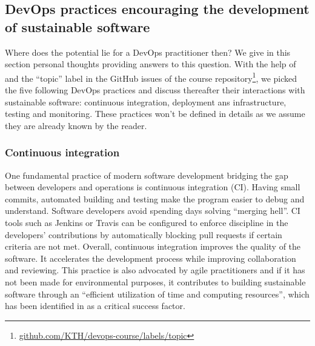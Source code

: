 \documentclass[11pt,twocolumn]{article}
\begin{document}
\subsection{DevOps practices encouraging the development of sustainable software}
\label{devops_practices}
Where does the potential lie for a DevOps practitioner then? We give in this section personal thoughts providing answers to this question. With the help of \cite{jabbariWhatDevOpsSystematic2016} and the ``topic'' label in the GitHub issues of the course repository\footnote{\url{github.com/KTH/devops-course/labels/topic}}, we picked the five following DevOps practices and discuss thereafter their interactions with sustainable software: continuous integration, deployment ans infrastructure, testing and monitoring. These practices won't be defined in details as we assume they are already known by the reader.

\subsubsection{Continuous integration}
One fundamental practice of modern software development bridging the gap between developers and operations is continuous integration (CI). Having small commits, automated building and testing make the program easier to debug and understand. Software developers avoid spending days solving ``merging hell''. CI tools such as Jenkins or Travis can be configured to enforce discipline in the developers' contributions by automatically blocking pull requests if certain criteria are not met. Overall, continuous integration improves the quality of the software. It accelerates the development process while improving collaboration and reviewing. This practice is also advocated by agile practitioners and if it has not been made for environmental purposes, it contributes to building sustainable software through an ``efficient utilization of time and computing resources'', which has been identified in \cite{rashidAgilePracticesGlobal2018} as a critical success factor.
\end{document}
